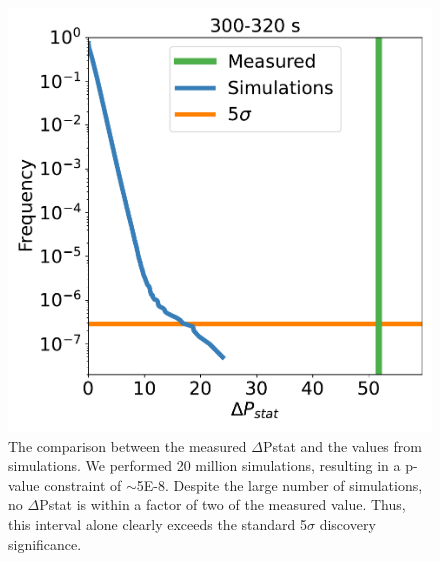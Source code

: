 \documentclass{aastex61}
\begin{document}
\begin{figure}
\centering
\includegraphics[scale=0.7]{figures/300-320_log.pdf}
\caption{The comparison between the measured $\Delta$Pstat and the values from simulations. We performed 20 million simulations, resulting in a p-value constraint of $\sim$5E-8. Despite the large number of simulations, no $\Delta$Pstat is within a factor of two of the measured value. Thus, this interval alone clearly exceeds the standard 5$\sigma$ discovery significance.}
\label{fig:significance}
\end{figure}
\end{document}
